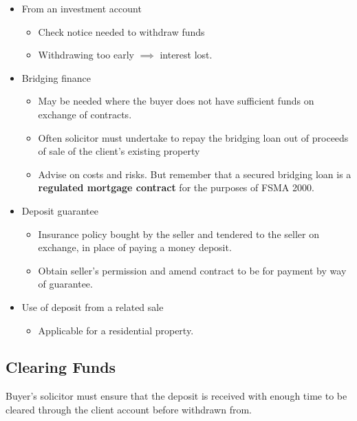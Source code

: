 \documentclass[
]{article}
\providecommand{\tightlist}{%
  \setlength{\itemsep}{0pt}\setlength{\parskip}{0pt}}
\begin{document}
\begin{itemize}
\tightlist
\item
  From an investment account

  \begin{itemize}
  \tightlist
  \item
    Check notice needed to withdraw funds
  \item
    Withdrawing too early \(\implies\) interest lost.
  \end{itemize}
\item
  Bridging finance

  \begin{itemize}
  \tightlist
  \item
    May be needed where the buyer does not have sufficient funds on
    exchange of contracts.
  \item
    Often solicitor must undertake to repay the bridging loan out of
    proceeds of sale of the client's existing property
  \item
    Advise on costs and risks. But remember that a secured bridging loan
    is a \textbf{regulated mortgage contract} for the purposes of FSMA
    2000.
  \end{itemize}
\item
  Deposit guarantee

  \begin{itemize}
  \tightlist
  \item
    Insurance policy bought by the seller and tendered to the seller on
    exchange, in place of paying a money deposit.
  \item
    Obtain seller's permission and amend contract to be for payment by
    way of guarantee.
  \end{itemize}
\item
  Use of deposit from a related sale

  \begin{itemize}
  \tightlist
  \item
    Applicable for a residential property.
  \end{itemize}
\end{itemize}

\hypertarget{clearing-funds}{%
\subsection{Clearing Funds}\label{clearing-funds}}

Buyer's solicitor must ensure that the deposit is received with enough
time to be cleared through the client account before withdrawn from.
\end{document}
